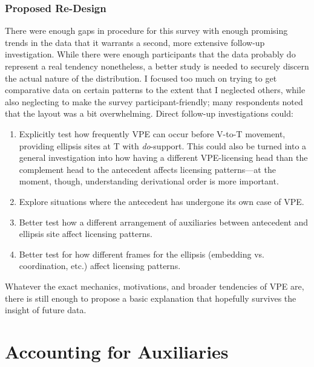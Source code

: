 \documentclass[11pt, oneside]{article}
\begin{document}
\subsubsection{Proposed Re-Design}

There were enough gaps in procedure for this survey with enough promising trends in the data that it warrants a second, more extensive follow-up investigation. While there were enough participants that the data probably do represent a real tendency nonetheless, a better study is needed to securely discern the actual nature of the distribution. I focused too much on trying to get comparative data on certain patterns to the extent that I neglected others, while also neglecting to make the survey participant-friendly; many respondents noted that the layout was a bit overwhelming. Direct follow-up investigations could:

\begin{exe}
\ex	\begin{enumerate}
	\item Explicitly test how frequently VPE can occur before V-to-T movement, providing ellipsis sites at T with \textit{do}-support. This could also be turned into a general investigation into how having a different VPE-licensing head than the complement head to the antecedent affects licensing patterns---at the moment, though, understanding derivational order is more important.
	\item Explore situations where the antecedent has undergone its own case of VPE.
	\item Better test how a different arrangement of auxiliaries between antecedent and ellipsis site affect licensing patterns. 
	\item Better test for how different frames for the ellipsis (embedding vs. coordination, etc.) affect licensing patterns.
	\end{enumerate}
\end{exe}

Whatever the exact mechanics, motivations, and broader tendencies of VPE are, there is still enough to propose a basic explanation that hopefully survives the insight of future data.

\section{Accounting for Auxiliaries}\label{SecAccAux}
\end{document}
